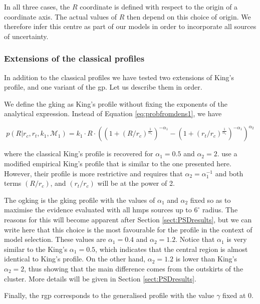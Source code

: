 In all three cases, the $R$ coordinate is defined with respect to the origin of a coordinate axis. The actual values of $R$ then depend on this choice of origin. We therefore infer this centre as part of our models in order to incorporate all sources of uncertainty. 


\subsubsection{Extensions of the classical profiles}

In addition to the classical profiles we have tested two extensions of King's profile, and one variant of the \gls{gp}. Let us describe them in order.

We define the \gls{gking} as King's profile without fixing the exponents of the analytical expression. Instead of Equation \ref{eq:probfromdens1}, we have

\begin{equation}
  p(R|r_c, r_t, k_1,\mathcal{M}_1)=k_1\cdot R \cdot
  \left(
  \left(1+(R/r_c)^{\frac{1}{\alpha_1}}\right)^{-\alpha_1}
  -
  \left(1+(r_t/r_c)^{\frac{1}{\alpha_1}}\right)^{-\alpha_1}
  \right)^{\alpha_2}
\label{eq:GKing}
\end{equation}

where the classical King's profile is recovered for $\alpha_1=0.5$ and $\alpha_2=2$. \citet{2017MNRAS.466.1513R} use a modified empirical King's profile that is similar to the one presented here. However, their profile is more restrictive and requires that $\alpha_2 = \alpha_1^{-1}$  and both terms $(R/r_c)$, and $(r_t/r_c)$ will be at the power of 2.

The \gls{ogking} is the \gls{gking} profile with the values of $\alpha_1$ and $\alpha_2$ fixed  so as to maximise the evidence evaluated with all \gls{hmps} sources up to $6^\circ$ radius. The reasons for this will become apparent after Section \ref{sect:PSDresults}, but we can write here that this choice is the most favourable for the  profile in the context of model selection. These values are $\alpha_1=0.4$ and $\alpha_2=1.2$. Notice that $\alpha_1$ is very similar to the King's $\alpha_1=0.5$, which indicates that the central region is almost identical to King's profile. On the other hand, $\alpha_2=1.2$ is lower than King's $\alpha_2=2$,  thus showing that the main difference comes from the outskirts of the cluster. More details will be given in Section \ref{sect:PSDresults}.

Finally, the \gls{rgp} corresponds to the generalised profile with the value $\gamma$ fixed at 0.


